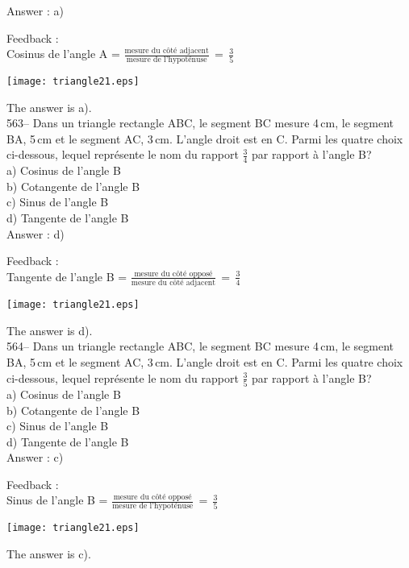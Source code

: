 ﻿\documentclass[letterpaper, 12pt]{article}
\begin{document}
Answer : a)

Feedback : \\
Cosinus de l'angle A = $\frac{\textrm{mesure du c\^ot\'e
adjacent}}{\textrm{mesure de
l'hypot\'enuse}}\,=\,\frac{\textrm{3}}{\textrm{5}}$\\
\begin{center}
    \texttt{[image: triangle21.eps]}
    \end{center}
The answer is a).\\

563-- Dans un triangle rectangle ABC, le segment BC mesure 4\,cm, le segment
BA, 5\,cm et le segment AC, 3\,cm.  L'angle droit est en C.  Parmi les
quatre choix ci-dessous, lequel repr\'esente le nom du rapport $\frac{3}{4}$
par rapport \`a l'angle B?\\
a) Cosinus de l'angle B\\
b) Cotangente de l'angle B\\
c) Sinus de l'angle B\\
d) Tangente de l'angle B\\

Answer : d)

Feedback : \\
Tangente de l'angle B = $\frac{\textrm{mesure du c\^ot\'e
oppos\'e}}{\textrm{mesure du c\^ot\'e
adjacent}}\,=\,\frac{\textrm{3}}{\textrm{4}}$\\
\begin{center}
    \texttt{[image: triangle21.eps]}
    \end{center}
The answer is d).\\

564-- Dans un triangle rectangle ABC, le segment BC mesure 4\,cm, le segment
BA, 5\,cm et le segment AC, 3\,cm.  L'angle droit est en C.  Parmi les
quatre choix ci-dessous, lequel repr\'esente le nom du rapport $\frac{3}{5}$
par rapport \`a l'angle B?\\
a) Cosinus de l'angle B\\
b) Cotangente de l'angle B\\
c) Sinus de l'angle B\\
d) Tangente de l'angle B\\

Answer : c)

Feedback : \\
Sinus de l'angle B = $\frac{\textrm{mesure du c\^ot\'e
oppos\'e}}{\textrm{mesure de
l'hypot\'enuse}}\,=\,\frac{\textrm{3}}{\textrm{5}}$\\
\begin{center}
    \texttt{[image: triangle21.eps]}
    \end{center}
The answer is c).\\
\end{document}
